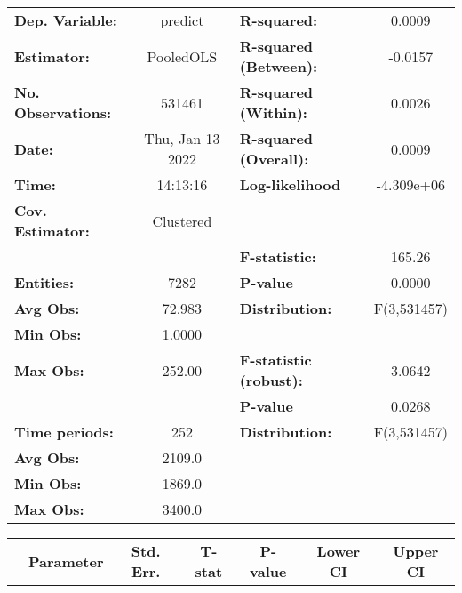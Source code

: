 \begin{center}
\begin{tabular}{lclc}
\toprule
\textbf{Dep. Variable:}    &      predict       & \textbf{  R-squared:         }   &      0.0009      \\
\textbf{Estimator:}        &     PooledOLS      & \textbf{  R-squared (Between):}  &     -0.0157      \\
\textbf{No. Observations:} &       531461       & \textbf{  R-squared (Within):}   &      0.0026      \\
\textbf{Date:}             &  Thu, Jan 13 2022  & \textbf{  R-squared (Overall):}  &      0.0009      \\
\textbf{Time:}             &      14:13:16      & \textbf{  Log-likelihood     }   &    -4.309e+06    \\
\textbf{Cov. Estimator:}   &     Clustered      & \textbf{                     }   &                  \\
\textbf{}                  &                    & \textbf{  F-statistic:       }   &      165.26      \\
\textbf{Entities:}         &        7282        & \textbf{  P-value            }   &      0.0000      \\
\textbf{Avg Obs:}          &       72.983       & \textbf{  Distribution:      }   &   F(3,531457)    \\
\textbf{Min Obs:}          &       1.0000       & \textbf{                     }   &                  \\
\textbf{Max Obs:}          &       252.00       & \textbf{  F-statistic (robust):} &      3.0642      \\
\textbf{}                  &                    & \textbf{  P-value            }   &      0.0268      \\
\textbf{Time periods:}     &        252         & \textbf{  Distribution:      }   &   F(3,531457)    \\
\textbf{Avg Obs:}          &       2109.0       & \textbf{                     }   &                  \\
\textbf{Min Obs:}          &       1869.0       & \textbf{                     }   &                  \\
\textbf{Max Obs:}          &       3400.0       & \textbf{                     }   &                  \\
\bottomrule
\end{tabular}
\begin{tabular}{lcccccc}
                & \textbf{Parameter} & \textbf{Std. Err.} & \textbf{T-stat} & \textbf{P-value} & \textbf{Lower CI} & \textbf{Upper CI}  \\

\end{tabular}
\end{center}
